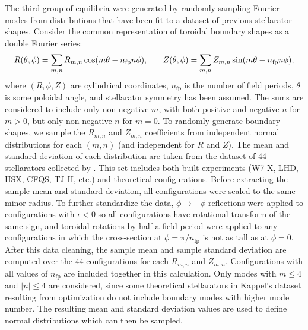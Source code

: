 \documentclass{jpp}
\newcommand{\nfp}{n_{\mathrm{fp}}}
\begin{document}
The third group of equilibria were generated by randomly sampling Fourier modes from distributions that have been fit to a dataset of previous stellarator shapes.
Consider the common representation of toroidal boundary shapes as a double Fourier series:
\begin{equation}
R(\theta,\phi)=\sum_{m,n} R_{m,n} \cos(m\theta-\nfp n\phi),
\hspace{0.25in}
Z(\theta,\phi)=\sum_{m,n} Z_{m,n} \sin(m\theta-\nfp n\phi),
\end{equation}
where $(R,\phi,Z)$ are cylindrical coordinates,  $\nfp$ is the number of field periods, $\theta$ is some poloidal angle, and stellarator symmetry has been assumed.
The sums are considered to include only non-negative $m$, with both positive and negative $n$ for $m>0$, but only non-negative $n$ for $m=0$.
To randomly generate boundary shapes, we sample the $R_{m,n}$ and $Z_{m,n}$ coefficients from independent normal distributions for each $(m,n)$ (and independent for $R$ and $Z$).
The mean and standard deviation of each distribution are taken from the dataset of 44 stellarators collected by \cite{kappel2024magnetic}.
This set includes both built experiments (W7-X, LHD, HSX, CFQS, TJ-II, etc.) and theoretical configurations.
Before extracting the sample mean and standard deviation, all configurations were scaled to the same minor radius.
To further standardize the data, $\phi \to -\phi$ reflections were applied to configurations with $\iota < 0$ so all configurations have rotational transform of the same sign, and toroidal rotations by half a field period were applied to any configurations in which the cross-section at $\phi=\pi/\nfp$ is not as tall as at $\phi=0$.
After this data cleaning, the sample mean and sample standard deviation are computed over the 44 configurations for each $R_{m,n}$ and $Z_{m,n}$.
Configurations with all values of $\nfp$ are included together in this calculation.
Only modes with $m \le 4$ and $|n| \le 4$ are considered, since some theoretical stellarators in Kappel's dataset resulting from optimization do not include boundary modes with higher mode number.
The resulting mean and standard deviation values are used to define normal distributions which can then be sampled.
\end{document}
